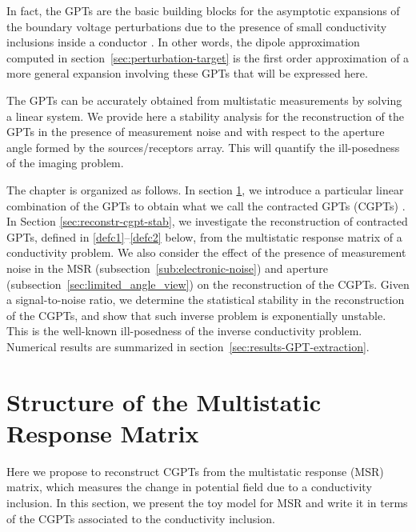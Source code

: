  In fact, the GPTs are
the basic building blocks for the asymptotic expansions of the
boundary voltage perturbations due to the presence of small
conductivity inclusions inside a conductor \cite{FV_ARMA_89,cedio1998identification,
ammarisima02}. In other words, the dipole approximation computed in
section~\ref{sec:perturbation-target} is the first order approximation of a more
general expansion involving these GPTs that will be expressed here.

The GPTs can be
accurately obtained from multistatic measurements by solving a
linear system. We provide here a stability analysis for the reconstruction of
the GPTs in the presence of measurement noise and with respect to the aperture
angle formed by the sources/receptors array. This will quantify the
ill-posedness of the imaging problem.


The chapter is organized as follows. In section
\ref{sec:struct-mult-resp}, we introduce a particular linear
combination of the GPTs  to obtain what we call the contracted
GPTs (CGPTs) \cite{AKLL11}. In Section
\ref{sec:reconstr-cgpt-stab}, we investigate the reconstruction of
contracted GPTs, defined in \eqref{defc1}--\eqref{defc2} below,
from the multistatic response matrix of a conductivity problem. We
also consider the effect of the presence of measurement noise in
the MSR (subsection~\ref{sub:electronic-noise}) and aperture 
(subsection~\ref{sec:limited_angle_view}) on the reconstruction of the CGPTs. Given a
signal-to-noise ratio, we determine  the statistical stability in
the reconstruction of the CGPTs, and show that such inverse
problem is exponentially unstable. This is the well-known
ill-posedness of the inverse conductivity problem. Numerical results are
summarized in section~\ref{sec:results-GPT-extraction}.

\section{Structure of the Multistatic Response Matrix}\label{sec:struct-mult-resp}

Here we propose to reconstruct CGPTs from the
multistatic response  (MSR) matrix, which measures the change in
potential field due to a conductivity inclusion. In this section,
we present the toy model for MSR and write it in terms of
the CGPTs associated to the conductivity inclusion.

